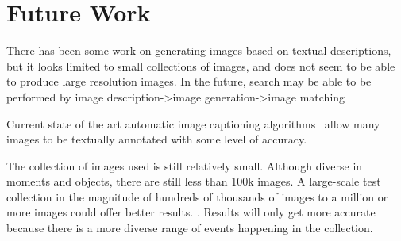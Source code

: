 \chapter{Future Work}


There has been some work on generating images based on textual descriptions, but it looks limited to small collections of images, and does not seem to be able to produce large resolution images. In the future, search may be able to be performed by image description->image generation->image matching 
 
Current state of the art automatic image captioning algorithms~\cite{karpathy2015deep} allow many images to be textually annotated with some level of accuracy. 
 
The collection of images used is still relatively small. Although diverse in moments and objects, there are still less than 100k images. A large-scale test collection in the magnitude of hundreds of thousands of images to a million or more images could offer better results. . Results will only get more accurate because there is a more diverse range of events happening in the collection.